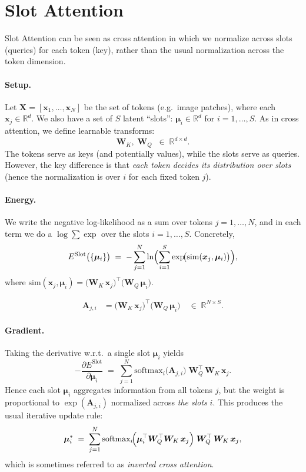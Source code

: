 \documentclass{article}
\begin{document}
\section{Slot Attention}
Slot Attention can be seen as cross attention in which we normalize across slots (queries) for each token (key), rather than the usual normalization across the token dimension.  

\paragraph{Setup.}
Let \(\bm{X} = [\bm{x}_1,\ldots,\bm{x}_N]\) be the set of tokens (e.g.\ image patches), where each \(\bm{x}_j \in \mathbb{R}^d\).  We also have a set of \(S\) latent ``slots'': \(\bm{\mu}_i \in \mathbb{R}^d\) for \(i = 1,\ldots,S\).  As in cross attention, we define learnable transforms:
\[
\bm{W}_K,\;\bm{W}_Q \;\;\in\;\mathbb{R}^{d \times d}.
\]
The tokens serve as keys (and potentially values), while the slots serve as queries.  However, the key difference is that \emph{each token decides its distribution over slots} (hence the normalization is over \(i\) for each fixed token \(j\)).

\paragraph{Energy.}
We write the negative log-likelihood as a sum over tokens \(j=1,\dots,N\), and in each term we do a \(\log \sum \exp\) over the slots \(i=1,\ldots,S\).  Concretely,
\[
E^{\mathrm{Slot}}\bigl(\{\bm{\mu}_i\}\bigr)
\;=\;
-\sum_{j=1}^N
\ln \Bigl(\sum_{i=1}^S
\exp\!\bigl(\mathrm{sim}(\bm{x}_j,\bm{\mu}_i)\bigr)\Bigr),
\]
where 
\(\mathrm{sim}(\bm{x}_j,\bm{\mu}_i)
=\bigl(\bm{W}_K\,\bm{x}_j\bigr)^\top \bigl(\bm{W}_Q\,\bm{\mu}_i\bigr).\)


\[
\begin{aligned}
\bm{A}_{j,i}
&=
\bigl(\bm{W}_K\,\bm{x}_j\bigr)^\top 
\bigl(\bm{W}_Q\,\bm{\mu}_i\bigr)
\quad\in\;\mathbb{R}^{N\times S}.
\end{aligned}
\]

\paragraph{Gradient.}
Taking the derivative w.r.t.\ a single slot \(\bm{\mu}_i\) yields
\[
-\frac{\partial E^{\mathrm{Slot}}}{\partial \bm{\mu}_i}
\;=\;
\sum_{j=1}^N
\text{softmax}_i\!\bigl(\bm{A}_{j,i}\bigr)
\;\bm{W}_Q^\top\,\bm{W}_K\,\bm{x}_j.
\]
Hence each slot \(\bm{\mu}_i\) aggregates information from all tokens \(j\), but the weight is proportional to \(\exp(\bm{A}_{j,i})\) normalized across \emph{the slots} \(i\).  This produces the usual iterative update rule:
\[
\bm{\mu}_i^*
\;=\;
\sum_{j=1}^N
\text{softmax}_i\!\Bigl(\bm{\mu}_i^\top \bm{W}_Q^\top \bm{W}_K \,\bm{x}_j\Bigr)
\;\bm{W}_Q^\top \,\bm{W}_K \,\bm{x}_j,
\]
which is sometimes referred to as \emph{inverted cross attention}.
\end{document}
